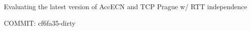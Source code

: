 	\def \plotsfolder {paper_prague}

Evaluating the latest version of AccECN and TCP Prague w/ RTT independence

	COMMIT: cf6fa35-dirty
